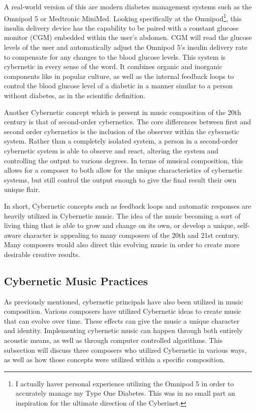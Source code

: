 A real-world version of this are modern diabetes management systems such as the Omnipod 5 or Medtronic MiniMed. Looking specifically at the Omnipod\footnote{I actually haver personal experience utilizing the Omnipod 5 in order to accurately manage my Type One Diabetes. This was in no small part an inspiration for the ultimate direction of the Cyberinet.}, this insulin delivery device has the capability to be paired with a constant glucose monitor (CGM) embedded within the user's abdomen. CGM will read the glucose levels of the user and automatically adjust the Omnipod 5's insulin delivery rate to compensate for any changes to the blood glucose levels. This system is cybernetic in every sense of the word. It combines organic and inorganic components like in popular culture, as well as the internal feedback loops to control the blood glucose level of a diabetic in a manner similar to a person without diabetes, as in the scientific definition.



Another Cybernetic concept which is present in music composition of the 20th century is that of second-order cybernetics. The core differences between first and second order cybernetics is the inclusion of the observer within the cybernetic system. Rather than a completely isolated system, a person in a second-order cybernetic system is able to observe and react, altering the system and controlling the output to various degrees. In terms of musical composition, this allows for a composer to both allow for the unique characteristics of cybernetic systems, but still control the output enough to give the final result their own unique flair.

In short, Cybernetic concepts such as feedback loops and automatic responses are heavily utilized in Cybernetic music. The idea of the music becoming a sort of living thing that is able to grow and change on its own, or develop a unique, self-aware character is appealing to many composers of the 20th and 21st century. Many composers would also direct this evolving music in order to create more desirable creative results.


\subsection{Cybernetic Music Practices}
As previously mentioned, cybernetic principals have also been utilized in music composition. Various composers have utilized Cybernetic ideas to create music that can evolve over time. These effects can give the music a unique character and identity. Implementing cybernetic music can happen through both entirely acoustic means, as well as through computer controlled algorithms. This subsection will discuss three composers who utilized Cybernetic in various ways, as well as how those concepts were utilized within a specific composition.


